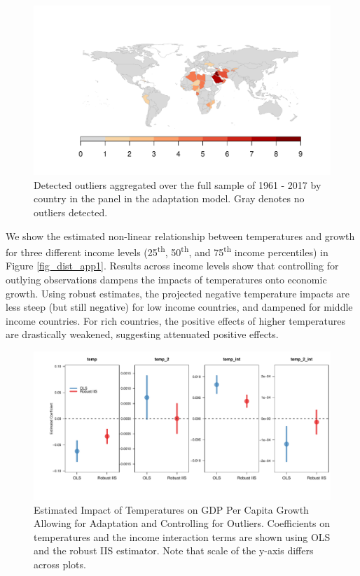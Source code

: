 \documentclass[11pt, letterpaper]{article}
\numberwithin{algorithm}{section}
\numberwithin{assumption}{section}
\numberwithin{lemma}{section}
\numberwithin{theorem}{section}
\numberwithin{corollary}{section}
\numberwithin{remark}{section}
\numberwithin{equation}{section}
\numberwithin{figure}{section}
\numberwithin{table}{section}
\begin{document}
\begin{figure}[!htbp]  %
\centering
\includegraphics[width = \textwidth]{ctry_map_adapt.pdf}
\caption{Detected outliers aggregated over the full sample of 1961 - 2017 by country in the panel in the adaptation model. Gray denotes no outliers detected.}
\label{fig_map_app1}
\end{figure}

We show the estimated non-linear relationship between temperatures and growth for three different income levels (25\textsuperscript{th}, 50\textsuperscript{th}, and 75\textsuperscript{th} income percentiles) in Figure \ref{fig_dist_app1}. Results across income levels show that controlling for outlying observations dampens the impacts of temperatures onto economic growth. Using robust estimates, the projected negative temperature impacts are less steep (but still negative) for low income countries, and dampened for middle income countries. For rich countries, the positive effects of higher temperatures are drastically weakened, suggesting attenuated positive effects.

\begin{figure}[!htbp]  %
\centering
\includegraphics[width = \textwidth]{coef.adapt.pdf}
\caption{Estimated Impact of Temperatures on GDP Per Capita Growth Allowing for Adaptation and Controlling for Outliers. Coefficients on temperatures and the income interaction terms are shown using OLS and the robust IIS estimator. Note that scale of the y-axis differs across plots.}
\label{fig_dist_coef_app1}
\end{figure}
\end{document}

